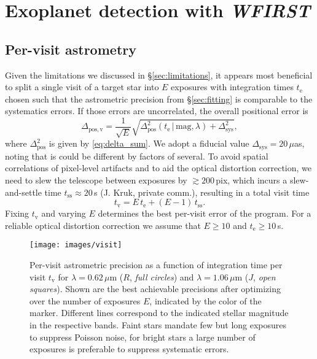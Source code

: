 \documentclass[modern, times]{aastex61}
\newcommand\wfirst{\textit{WFIRST}}
\begin{document}
\section{Exoplanet detection with \wfirst}
\label{sec:exoplanets}

\subsection{Per-visit astrometry}
Given the limitations we discussed in \S\ref{sec:limitations}, it appears most beneficial to split a single visit of a target star into $E$ exposures with integration times $t_\mathrm{e}$ chosen such that the astrometric precision from \S\ref{sec:fitting} is comparable to the systematics errors.
If those errors are uncorrelated, the overall positional error is
\begin{equation}
\label{eq:delta_visit}
\Delta_\mathrm{pos,v} = \frac{1}{\sqrt{E}} \sqrt{\Delta^2_\mathrm{pos}(t_\mathrm{e}\,|\,\mathrm{mag}, \lambda) + \Delta_\mathrm{sys}^2},
\end{equation}
where $\Delta^2_\mathrm{pos}$ is given by \autoref{eq:delta_sum}.
We adopt a fiducial value $\Delta_\mathrm{sys}=20\,\mu$as, noting that is could be different by factors of several.
To avoid spatial correlations of pixel-level artifacts and to aid the optical distortion correction, we need to slew the telescope between exposures by $\gtrsim200\,$pix, which incurs a slew-and-settle time $t_\mathrm{ss} \approx 20$\,s (J. Kruk, private comm.),
resulting in a total visit time 
\begin{equation}
t_\mathrm{v} = E \,t_\mathrm{e} + (E-1)\,t_\mathrm{ss}.
\end{equation}
Fixing $t_\mathrm{v}$ and varying $E$ determines the best per-visit error of the program. For a reliable optical distortion correction we assume that $E \geq 10$ and $t_\mathrm{e} \geq 10\,$s.


\begin{figure}[t]
\centering\texttt{[image: images/visit]}
\caption{Per-visit astrometric precision as a function of integration time per visit $t_\mathrm{v}$ for $\lambda=0.62\,\mu$m ($R$, \emph{full circles}) and $\lambda=1.06\,\mu$m ($J$, \emph{open squares}).
Shown are the best achievable precisions after optimizing over the number of exposures $E$, indicated by the color of the marker.
Different lines correspond to the indicated stellar magnitude in the respective bands.
Faint stars mandate few but long exposures to suppress Poisson noise, for bright stars a large number of exposures is preferable to suppress systematic errors.}
\label{fig:visit}
\end{figure}
\end{document}
